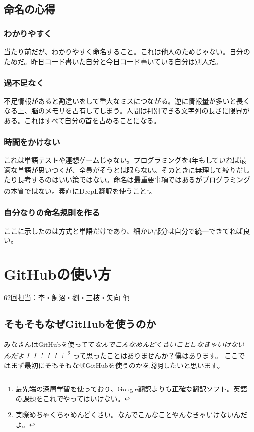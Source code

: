 \documentclass[dvipdfmx,jb5]{jarticle}
\begin{document}
\subsection{命名の心得}
\subsubsection{わかりやすく}
当たり前だが、わかりやすく命名すること。これは他人のためじゃない。自分のためだ。昨日コード書いた自分と今日コード書いている自分は別人だ。
\subsubsection{過不足なく}
不足情報があると勘違いをして重大なミスにつながる。逆に情報量が多いと長くなる上、脳のメモリを占有してしまう。人間は判別できる文字列の長さに限界がある。これはすべて自分の首を占めることになる。
\subsubsection{時間をかけない}
これは単語テストや連想ゲームじゃない。プログラミングを4年もしていれば最適な単語が思いつくが、全員がそうとは限らない。そのときに無理して絞りだしたり長考するのはいい策ではない。命名は最重要事項ではあるがプログラミングの本質ではない。素直にDeepL翻訳を使うこと\footnote{最先端の深層学習を使っており、Google翻訳よりも正確な翻訳ソフト。英語の課題をこれでやってはいけない。}。
\subsubsection{自分なりの命名規則を作る}
ここに示したのは方式と単語だけであり、細かい部分は自分で統一できてれば良い。
\section{GitHubの使い方}
62回担当：李・飼沼・劉・三枝・矢向 他
\subsection{そもそもなぜGitHubを使うのか}
みなさんはGitHubを使ってて\emph{なんでこんなめんどくさいことしなきゃいけないんだよ！！！！！！}
\footnote{実際めちゃくちゃめんどくさい。なんでこんなことやんなきゃいけないんだよ。}
って思ったことはありませんか？僕はあります。
ここではまず最初にそもそもなぜGitHubを使うのかを説明したいと思います。
\end{document}
